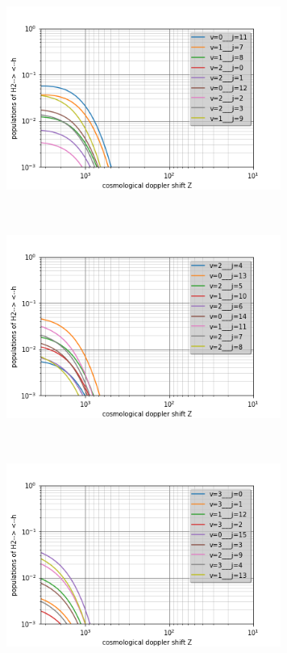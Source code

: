 \documentclass[10pt, a4paper]{report}
\numberwithin{equation}{subsection}
\begin{document}
\begin{figure}[]
\begin{subfigure}{0.5\textwidth}
\centering
\includegraphics[width=9cm,height=7cm]{levelsh2-h.2.png}
\end{subfigure}
\begin{subfigure}{0.5\textwidth}
\centering
\includegraphics[width=9cm,height=7cm]{levelsh2-h.3.png}
\end{subfigure}
\begin{subfigure}{0.5\textwidth}
\centering
\includegraphics[width=9cm,height=7cm]{levelsh2-h.4.png}

\end{subfigure}
\end{figure}
\end{document}
